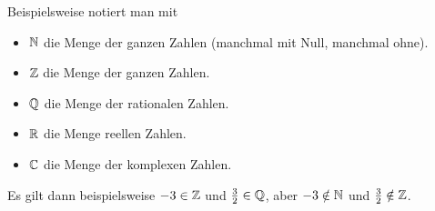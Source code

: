 \begin{bsp}[Zahlbereiche]
    Beispielsweise notiert man mit
    \begin{itemize}
        \item $\mathbb N$ die Menge der ganzen Zahlen (manchmal mit Null, manchmal ohne).
        \item $\mathbb Z$ die Menge der ganzen Zahlen.
        \item $\mathbb Q$ die Menge der rationalen Zahlen.
        \item $\mathbb R$ die Menge reellen Zahlen.
        \item $\mathbb C$ die Menge der komplexen Zahlen.
    \end{itemize}
    Es gilt dann beispielsweise $-3\in \mathbb Z$ und $\frac{3}{2}\in\mathbb Q$, aber $-3\notin \mathbb N$ und $\frac{3}{2}\notin \mathbb Z$.
\end{bsp}


